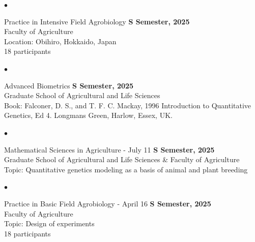 \documentclass[margin,line,10pt]{res}
\newenvironment{list2}{
  \begin{list}{$\bullet$}{%
      \setlength{\itemsep}{0in}
      \setlength{\parsep}{0in} \setlength{\parskip}{0in}
      \setlength{\topsep}{0in} \setlength{\partopsep}{0in} 
      \setlength{\leftmargin}{0.2in}}}{\end{list}}
\begin{document}
\begin{resume}
 
\vspace{0.4cm}


\begin{list2}
  \item Practice in Intensive Field Agrobiology \hfill {\bf S Semester, 2025} \\ %
  Faculty of Agriculture \\ %
  Location: Obihiro, Hokkaido, Japan \\
  18  participants 
\end{list2}


\vspace{0.4cm}

\begin{list2}
  \item Advanced Biometrics  \hfill {\bf S Semester, 2025} \\  %
  Graduate School of Agricultural and Life Sciences \\ %
  Book: Falconer, D. S., and T. F. C. Mackay, 1996 Introduction to Quantitative Genetics, Ed 4. Longmans Green, Harlow, Essex, UK.
 \end{list2}
 
 \vspace{0.4cm}


\begin{list2}
  \item Mathematical Sciences in Agriculture - July 11 \hfill {\bf S Semester, 2025} \\ %
  Graduate School of Agricultural and Life Sciences \& Faculty of Agriculture \\ %
  Topic: Quantitative genetics modeling as a basis of animal and plant breeding %
\end{list2}

\vspace{0.4cm}

\begin{list2}
  \item Practice in Basic Field Agrobiology - April 16 \hfill {\bf S Semester, 2025} \\ %
  Faculty of Agriculture \\ %
  Topic: Design of experiments \\ %
  18  participants 
\end{list2}


\end{resume}
\end{document}
